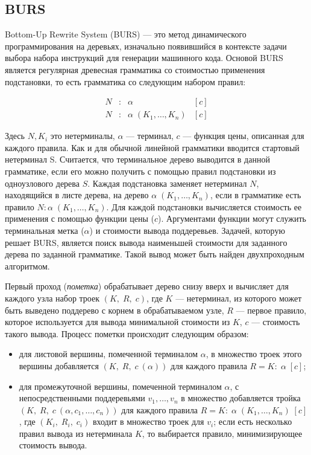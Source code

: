 \subsection{BURS}

Bottom-Up Rewrite System (BURS)\cite{burs} --- это метод динамического
программирования на деревьях, изначально появившийся в контексте задачи выбора
набора инструкций для генерации машинного кода. Основой BURS является
регулярная древесная грамматика\cite{tata} со стоимостью применения подстановки,
то есть грамматика со следующим набором правил: 

$$
\begin{array}{rcll}
  N &:& \alpha& [c]\\
  N &:& \alpha\; (K_1,\dots,K_n)& [c]
\end{array}
$$

Здесь $N, K_i$ это нетерминалы, $\alpha$ --- терминал,
$c$ --- функция цены, описанная для каждого правила.
Как и для обычной линейной грамматики вводится стартовый
нетерминал S. Считается, что терминальное дерево выводится в
данной грамматике, если его можно получить с помощью правил
подстановки из одноузлового дерева $S$.
Каждая подстановка заменяет нетерминал $N$, находящийся в листе дерева, на дерево 
$\alpha\;(K_1,\dots,K_n)$, если в грамматике есть правило
$N:\alpha\;(K_1,\dots,K_n)$. 
Для каждой подстановки вычисляется стоимость ее применения с помощью
функции цены ($c$).
Аргументами функции могут служить терминальная метка ($\alpha$) и стоимости
вывода поддеревьев.
Задачей, которую решает BURS, является поиск вывода наименьшей стоимости
для заданного дерева по заданной грамматике.
Такой вывод может быть найден двухпроходным алгоритмом.

Первый проход (\emph{пометка}) обрабатывает дерево снизу вверх и вычисляет
для каждого узла набор троек $(K,\;R,\;c)$, где $K$ --- нетерминал, из которого может быть
выведено поддерево с корнем в обрабатываемом узле,
$R$ --- первое правило, которое используется для вывода минимальной стоимости из $K$,
$c$ --- стоимость такого вывода.
Процесс пометки происходит следующим образом:

\begin{itemize}
\item для листовой вершины, помеченной терминалом $\alpha$, в множество троек
этого вершины добавляется $(K,\;R,\;c\:(\alpha))$ для каждого правила $R=K:\;\alpha\;[c]$;
\item для промежуточной вершины, помеченной терминалом $\alpha$,
с непосредственными поддеревьями $v_1,\dots,v_n$
в множество добавляется тройка $(K,\;R,\;c\:(\alpha,c_1,\dots,c_n))$ для каждого правила
$R=K:\;\alpha\;(K_1,\dots,K_n)\;[c]$, где $(K_i,\;R_i,\;c_i)$ входит в множество троек для
$v_i$; если есть несколько правил вывода из нетерминала $K$, то выбирается правило,
минимизирующее стоимость вывода.
\end{itemize}

